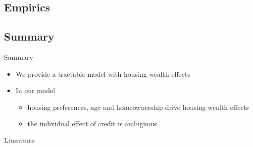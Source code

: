 \documentclass[aspectratio=169,mathserif,xcolor=dvipsnames]{beamer}
\begin{document}
 \subsection{Empirics}
 
 \subsection{Summary}

 \begin{frame}{Summary}
   \begin{itemize}
   \item We provide a tractable model with housing wealth effects
   \item In our model
     \begin{itemize}
     \item housing preferences, age and homeownership drive housing wealth effects
     \item the individual effect of credit is ambiguous
     \end{itemize}
   \end{itemize}
 \end{frame}

 \begin{frame}[allowframebreaks]{Literature}
    
   
 \end{frame}
\end{document}
